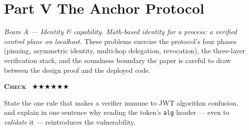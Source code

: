 %

\providecommand{\hhcobalt}{}  %

\providecommand{\wbstars}[1]{{\footnotesize\textcolor{hhcobalt}{%
  \ifcase#1\or$\bigstar$\or$\bigstar\bigstar$\or$\bigstar\bigstar\bigstar$\fi}}}

\providecommand{\wbtier}[1]{{\footnotesize\scshape\bfseries\textcolor{hhink}{#1}}}

\providecommand{\wbq}[4]{%
  \par\medskip\noindent
  \makebox[0pt][r]{\textbf{V.#1}\hspace{1.2em}}%
  \wbtier{#2}~\wbstars{#3}\par\nopagebreak
  \noindent\ignorespaces #4\par}

\section*{Part V \quad The Anchor Protocol}

\noindent\textit{Beam A — Identity \& capability. Math-based identity for a
process: a verified control plane on localhost.} These problems exercise the
protocol's four phases (pinning, asymmetric identity, multi-hop delegation,
revocation), the three-layer verification stack, and the soundness boundary the
paper is careful to draw between the design proof and the deployed code.

\wbq{1}{Check}{1}{%
State the one rule that makes a verifier immune to JWT algorithm confusion, and
explain in one sentence why reading the token's \texttt{alg} header --- even to
\emph{validate} it --- reintroduces the vulnerability.}

